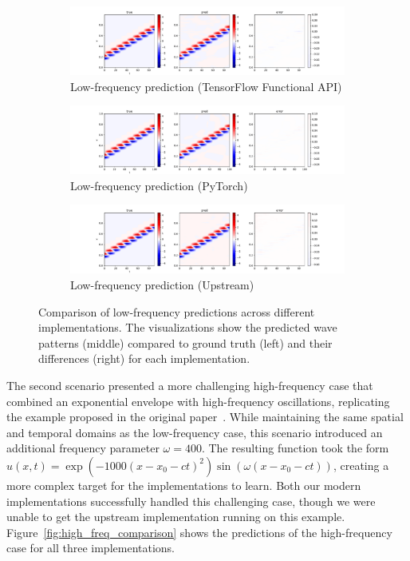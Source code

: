 \documentclass[10pt,journal,compsoc,onecolumn]{IEEEtran}
\begin{document}
\begin{figure}[htbp]
    \centering
    \begin{subfigure}[b]{0.9\textwidth}
        \includegraphics[width=\textwidth]{../../results/functional/low-frequency-adam-20250206-1105-1/vis}
        \caption{Low-frequency prediction (TensorFlow Functional API)}
    \end{subfigure}
    \begin{subfigure}[b]{0.9\textwidth}
        \includegraphics[width=\textwidth]{../../results/pytorch/low-frequency-adam-20250206-1600-4/vis}
        \caption{Low-frequency prediction (PyTorch)}
    \end{subfigure}
    \begin{subfigure}[b]{0.9\textwidth}
        \includegraphics[width=\textwidth]{../../results/upstream/low-frequency-adabelief-20250206-1105-3/vis}
        \caption{Low-frequency prediction (Upstream)}
    \end{subfigure}
    \caption{Comparison of low-frequency predictions across different implementations. The visualizations show the predicted wave patterns (middle) compared to ground truth (left) and their differences (right) for each implementation.}
    \label{fig:low_freq_comparison}
\end{figure}

The second scenario presented a more challenging high-frequency case that combined an exponential envelope with high-frequency oscillations, replicating the example proposed in the original paper~\cite{nif2023github}. While maintaining the same spatial and temporal domains as the low-frequency case, this scenario introduced an additional frequency parameter $\omega = 400$. The resulting function took the form $u(x,t) = \exp(-1000(x-x_0-ct)^2)\sin(\omega(x-x_0-ct))$, creating a more complex target for the implementations to learn. Both our modern implementations successfully handled this challenging case, though we were unable to get the upstream implementation running on this example. Figure~\ref{fig:high_freq_comparison} shows the predictions of the high-frequency case for all three implementations.
\end{document}
